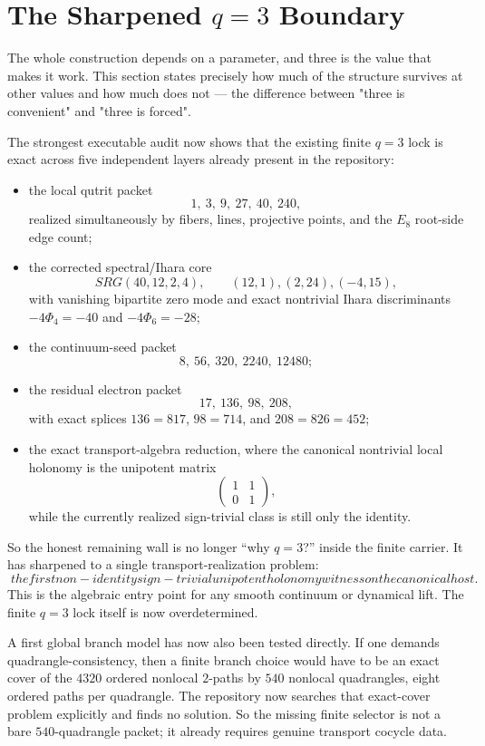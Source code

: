 \documentclass[12pt,a4paper]{article}
\def\mathrm#1{#1}%
\def\text#1{#1}%
\def\Phi#1{Phi#1}%
\def\cdot{ }%
\theoremstyle{definition}
\newcommand{\SRG}{\mathrm{SRG}}
\begin{document}
\section*{The Sharpened $q=3$ Boundary}

\begin{plainbox}
The whole construction depends on a parameter, and three is the value that makes it
work. This section states precisely how much of the structure survives at other values and
how much does not --- the difference between "three is convenient" and "three is forced".
\end{plainbox}


The strongest executable audit now shows that the existing finite
$q=3$ lock is exact across five independent layers already present in
the repository:
\begin{itemize}[leftmargin=2em,nosep]
\item the local qutrit packet
\[
1,\ 3,\ 9,\ 27,\ 40,\ 240,
\]
realized simultaneously by fibers, lines, projective points, and the
$E_8$ root-side edge count;
\item the corrected spectral/Ihara core
\[
\SRG(40,12,2,4),\qquad (12,1),(2,24),(-4,15),
\]
with vanishing bipartite zero mode and exact nontrivial Ihara
discriminants $-4\Phi_4=-40$ and $-4\Phi_6=-28$;
\item the continuum-seed packet
\[
8,\ 56,\ 320,\ 2240,\ 12480;
\]
\item the residual electron packet
\[
17,\ 136,\ 98,\ 208,
\]
with exact splices $136=8\cdot 17$, $98=7\cdot 14$, and
$208=8\cdot 26 = 4\cdot 52$;
\item the exact transport-algebra reduction, where the canonical
nontrivial local holonomy is the unipotent matrix
\[
\begin{pmatrix}1&1\\0&1\end{pmatrix},
\]
while the currently realized sign-trivial class is still only the
identity.
\end{itemize}

So the honest remaining wall is no longer ``why $q=3$?'' inside the
finite carrier.  It has sharpened to a single transport-realization
problem:
\[
\boxed{\;
\text{the first non-identity sign-trivial unipotent holonomy witness on the canonical host.}
\;}
\]
This is the algebraic entry point for any smooth continuum or
dynamical lift.  The finite $q=3$ lock itself is now overdetermined.

A first global branch model has now also been tested directly.  If one
demands quadrangle-consistency, then a finite branch choice would have
to be an exact cover of the $4320$ ordered nonlocal $2$-paths by
$540$ nonlocal quadrangles, eight ordered paths per quadrangle.
The
repository now searches that exact-cover problem explicitly and finds no
solution.  So the missing finite selector is not a bare $540$-quadrangle
packet; it already requires genuine transport cocycle data.
\end{document}
